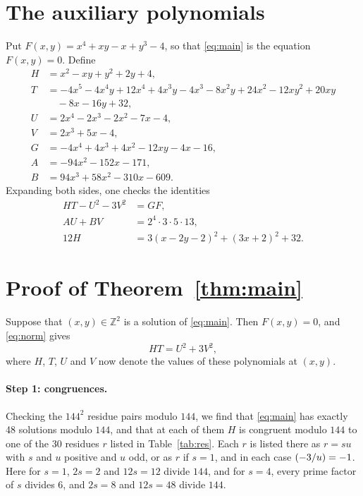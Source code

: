 \documentclass[11pt]{article}
\newcommand{\Z}{\mathbb{Z}}
\newcommand{\leg}[2]{\mathchoice{\biggl(\dfrac{#1}{#2}\biggr)}{(#1/#2)}{(#1/#2)}{(#1/#2)}}
\begin{document}
\section{The auxiliary polynomials}

Put $F(x,y)=x^{4}+xy-x+y^{3}-4$, so that \eqref{eq:main} is the equation $F(x,y)=0$. Define
\begin{align*}
H&=x^{2}-xy+y^{2}+2y+4,\\
T&=-4x^{5}-4x^{4}y+12x^{4}+4x^{3}y-4x^{3}-8x^{2}y+24x^{2}-12xy^{2}+20xy\\
&\quad-8x-16y+32,\\
U&=2x^{4}-2x^{3}-2x^{2}-7x-4,\\
V&=2x^{3}+5x-4,\\
G&=-4x^{4}+4x^{3}+4x^{2}-12xy-4x-16,\\
A&=-94x^{2}-152x-171,\\
B&=94x^{3}+58x^{2}-310x-609.
\end{align*}
Expanding both sides, one checks the identities
\begin{align}
HT-U^2-3V^2&=GF,\label{eq:norm}\\
AU+BV&=2^{4}\cdot 3\cdot 5\cdot 13,\label{eq:bezout}\\
12H&=3(x-2y-2)^2+(3x+2)^2+32.\label{eq:sign}
\end{align}

\section{Proof of Theorem~\ref{thm:main}}

Suppose that $(x,y)\in\Z^2$ is a solution of \eqref{eq:main}. Then $F(x,y)=0$, and \eqref{eq:norm} gives
\begin{equation}\label{eq:HT}
HT=U^2+3V^2,
\end{equation}
where $H$, $T$, $U$ and $V$ now denote the values of these polynomials at $(x,y)$.

\paragraph{Step 1: congruences.} Checking the $144^2$ residue pairs modulo $144$, we find that \eqref{eq:main} has exactly 48 solutions modulo $144$, and that at each of them $H$ is congruent modulo $144$ to one of the 30 residues $r$ listed in Table~\ref{tab:res}. Each $r$ is listed there as $r=su$ with $s$ and $u$ positive and $u$ odd, or as $r$ if $s=1$, and in each case $\leg{-3}{u}=-1$. Here for $s=1$, $2s=2$ and $12s=12$ divide $144$, and for $s=4$, every prime factor of $s$ divides $6$, and $2s=8$ and $12s=48$ divide $144$.
\end{document}
